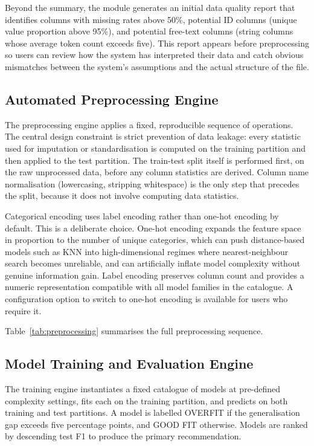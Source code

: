 \documentclass[conference]{IEEEtran}
\begin{document}
Beyond the summary, the module generates an initial data quality report that identifies columns with missing rates above 50\%, potential ID columns (unique value proportion above 95\%), and potential free-text columns (string columns whose average token count exceeds five). This report appears before preprocessing so users can review how the system has interpreted their data and catch obvious mismatches between the system's assumptions and the actual structure of the file.

\subsection{Automated Preprocessing Engine}

The preprocessing engine applies a fixed, reproducible sequence of operations. The central design constraint is strict prevention of data leakage: every statistic used for imputation or standardisation is computed on the training partition and then applied to the test partition. The train-test split itself is performed first, on the raw unprocessed data, before any column statistics are derived. Column name normalisation (lowercasing, stripping whitespace) is the only step that precedes the split, because it does not involve computing data statistics.

Categorical encoding uses label encoding rather than one-hot encoding by default. This is a deliberate choice. One-hot encoding expands the feature space in proportion to the number of unique categories, which can push distance-based models such as KNN into high-dimensional regimes where nearest-neighbour search becomes unreliable, and can artificially inflate model complexity without genuine information gain. Label encoding preserves column count and provides a numeric representation compatible with all model families in the catalogue. A configuration option to switch to one-hot encoding is available for users who require it.

Table~\ref{tab:preprocessing} summarises the full preprocessing sequence.

\subsection{Model Training and Evaluation Engine}

The training engine instantiates a fixed catalogue of models at pre-defined complexity settings, fits each on the training partition, and predicts on both training and test partitions. A model is labelled OVERFIT if the generalisation gap exceeds five percentage points, and GOOD FIT otherwise. Models are ranked by descending test F1 to produce the primary recommendation.
\end{document}

